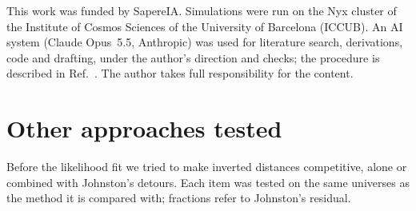\documentclass[prd,twocolumn,superscriptaddress,nofootinbib,amsmath,amssymb,floatfix]{revtex4-2}
\begin{document}
\begin{acknowledgments}
This work was funded by SapereIA. Simulations were run on the Nyx cluster of the Institute of Cosmos Sciences of the University of Barcelona (ICCUB). An AI system (Claude Opus~5.5, Anthropic) was used for literature search, derivations, code and drafting, under the author's direction and checks; the procedure is described in Ref.~\cite{MethodNote}. The author takes full responsibility for the content.
\end{acknowledgments}

\appendix
\section{Other approaches tested}\label{app:dropped}
Before the likelihood fit we tried to make inverted distances competitive, alone or combined with Johnston's detours. Each item was tested on the same universes as the method it is compared with; fractions refer to Johnston's residual.
\end{document}
